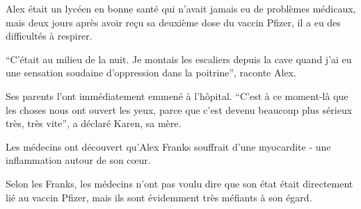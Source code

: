 Alex était un lycéen en bonne santé qui n'avait jamais eu de problèmes médicaux,
mais deux jours après avoir reçu sa deuxième dose du vaccin Pfizer, il a eu des
difficultés à respirer.

``C'était au milieu de la nuit. Je montais les escaliers depuis la cave quand
j'ai eu une sensation soudaine d'oppression dans la poitrine'', raconte Alex.

Ses parents l'ont immédiatement emmené à l'hôpital. ``C'est à ce moment-là que
les choses nous ont ouvert les yeux, parce que c'est devenu beaucoup plus
sérieux très, très vite'', a déclaré Karen, sa mère.

Les médecins ont découvert qu'Alex Franks souffrait d'une myocardite - une
inflammation autour de son cœur.

Selon les Franks, les médecins n'ont pas voulu dire que son état était
directement lié au vaccin Pfizer, mais ils sont évidemment très méfiants à son
égard.
